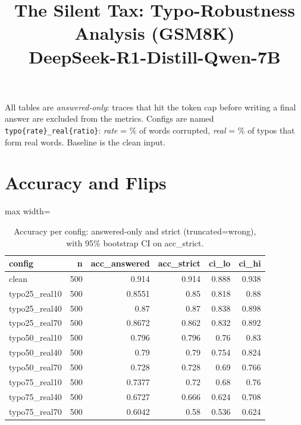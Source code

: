 \documentclass[11pt]{article}
\title{The Silent Tax: Typo-Robustness Analysis (GSM8K)\\\large DeepSeek-R1-Distill-Qwen-7B}
\date{}
\begin{document}
\maketitle
\noindent All tables are \emph{answered-only}: traces that hit the token cap before writing a final answer are excluded from the metrics. Configs are named \texttt{typo\{rate\}\_real\{ratio\}}: \emph{rate} = \% of words corrupted, \emph{real} = \% of typos that form real words. Baseline is the clean input.

\section*{Accuracy and Flips}
\begin{table}[H]
\centering
\caption{Accuracy per config: answered-only and strict (truncated=wrong), with 95\% bootstrap CI on acc\_strict.}
\small
\begin{adjustbox}{max width=\textwidth}
\begin{tabular}{lrrrrr}
\toprule
\textbf{config} & \textbf{n} & \textbf{acc\_answered} & \textbf{acc\_strict} & \textbf{ci\_lo} & \textbf{ci\_hi} \\
\midrule
clean & 500 & 0.914 & 0.914 & 0.888 & 0.938 \\
typo25\_real10 & 500 & 0.8551 & 0.85 & 0.818 & 0.88 \\
typo25\_real40 & 500 & 0.87 & 0.87 & 0.838 & 0.898 \\
typo25\_real70 & 500 & 0.8672 & 0.862 & 0.832 & 0.892 \\
typo50\_real10 & 500 & 0.796 & 0.796 & 0.76 & 0.83 \\
typo50\_real40 & 500 & 0.79 & 0.79 & 0.754 & 0.824 \\
typo50\_real70 & 500 & 0.728 & 0.728 & 0.69 & 0.766 \\
typo75\_real10 & 500 & 0.7377 & 0.72 & 0.68 & 0.76 \\
typo75\_real40 & 500 & 0.6727 & 0.666 & 0.624 & 0.708 \\
typo75\_real70 & 500 & 0.6042 & 0.58 & 0.536 & 0.624 \\
\bottomrule
\end{tabular}
\end{adjustbox}
\end{table}
\end{document}
